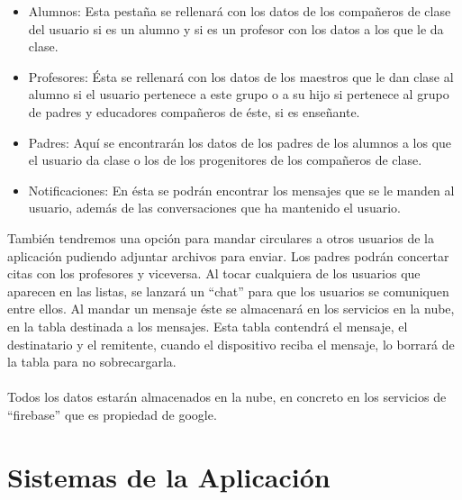 \begin{itemize}
	\item Alumnos: Esta pesta\~na se rellenar\'a con los datos de los compa\~neros de clase del usuario si es un alumno y si es un profesor con los datos a los que le da clase.
	\item Profesores: \'Esta se rellenar\'a con los datos de los maestros que le dan clase al alumno si el usuario pertenece a este grupo o  a su hijo si pertenece al grupo de padres y educadores compa\~neros de \'este, si es ense\~nante.
	\item Padres: Aqu\'i se encontrar\'an los datos de los padres de los alumnos a los que el usuario da clase o los de los progenitores de los compa\~neros de clase.
	\item Notificaciones: En \'esta se podr\'an encontrar los mensajes que se le manden al usuario, adem\'as de las conversaciones que ha mantenido el usuario. \linebreak
\end{itemize}Tambi\'en tendremos una opci\'on para mandar circulares a otros usuarios de la aplicaci\'on pudiendo adjuntar archivos para enviar. Los padres podr\'an concertar citas con los profesores y viceversa.
Al tocar cualquiera de los usuarios que aparecen en las listas, se lanzará un ``chat'' para que los usuarios se comuniquen entre ellos. Al mandar un mensaje \'este se almacenar\'a en los servicios en la nube, en la tabla destinada a los mensajes. Esta tabla contendr\'a el mensaje, el destinatario y el remitente, cuando el dispositivo reciba el mensaje, lo borrará de la tabla para no sobrecargarla.\\
\\
Todos los datos estar\'an almacenados en la nube, en concreto en los servicios de ``firebase'' que es propiedad de google.

\section{Sistemas de la Aplicaci\'on}

